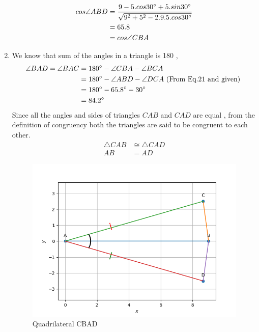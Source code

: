 \documentclass{article}
\begin{document}
\begin{enumerate}
\begin{align}
	cos\angle{ABD} &= \frac{9-5.cos30\degree{}+5.sin30\degree{}}{\sqrt{9^2+5^2-2.9.5.cos30\degree{}}}\\
		       &= 65.8\\
                       &= cos\angle{CBA}\\
\end{align}
\item We know that sum of the angles in a triangle is 180\degree{} ,
\begin{align}
\angle{BAD}=\angle{BAC} & = 180\degree{} - \angle{CBA} - \angle{BCA}\\
		    & = 180\degree{} - \angle{ABD} - \angle{DCA} \text{ (From Eq.21 and given) } \\
		    & = 180\degree{} - 65.8\degree{} -30\degree{}\\
		    & = 84.2\degree{} 
\end{align}
Since all the angles and sides of triangles $CAB$ and $CAD$ are equal , from the definition of congruency both the triangles are said to be congruent to each other.
\begin{align}
        \triangle{CAB} & \cong \triangle{CAD}\\
        AB &= AD 
\end{align}
\begin{figure}
	\begin{center}
		\includegraphics[width=\columnwidth]{figs/graph.png}
		\caption{Quadrilateral CBAD}
		\label{fig:Fig}
	\end{center}
\end{figure}
\end{enumerate}
\end{document}
